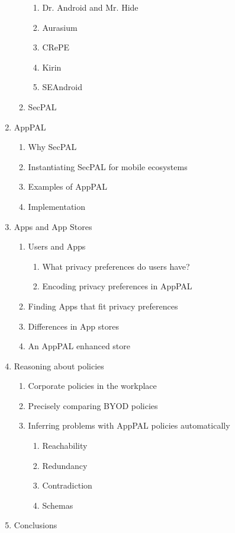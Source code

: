 \documentclass[a4paper]{scrartcl}
\begin{document}
\begin{enumerate}
\begin{enumerate}[2.1]
\begin{enumerate}[2.3.1]
    \item Dr. Android and Mr. Hide
    \item Aurasium
    \item CRePE
    \item Kirin
    \item SEAndroid
    \end{enumerate}
  \item SecPAL
  \end{enumerate}
\item AppPAL
  \begin{enumerate}[3.1]
  \item Why SecPAL
  \item Instantiating SecPAL for mobile ecosystems
  \item Examples of AppPAL
  \item Implementation
  \end{enumerate}
\item Apps and App Stores
  \begin{enumerate}[4.1]
  \item Users and Apps
    \begin{enumerate}[4.1.1]
    \item What privacy preferences do users have?
    \item Encoding privacy preferences in AppPAL
    \end{enumerate}
  \item Finding Apps that fit privacy preferences
  \item Differences in App stores
  \item An AppPAL enhanced store
  \end{enumerate}
\item Reasoning about policies
  \begin{enumerate}[5.1]
  \item Corporate policies in the workplace
  \item Precisely comparing BYOD policies
  \item Inferring problems with AppPAL policies automatically
    \begin{enumerate}[5.1.3]
    \item Reachability
    \item Redundancy
    \item Contradiction
    \item Schemas
    \end{enumerate}
  \end{enumerate}
\item Conclusions
\end{enumerate}
\end{document}
